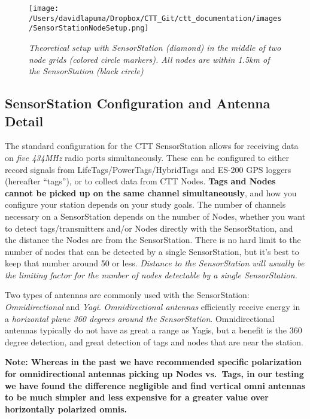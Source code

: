 \documentclass[
]{article}
\begin{document}
\begin{figure}
\hypertarget{id}{%
\centering
\texttt{[image: /Users/davidlapuma/Dropbox/CTT\_Git/ctt\_documentation/images/SensorStationNodeSetup.png]}
\caption{\emph{Theoretical setup with SensorStation (diamond) in the
middle of two node grids (colored circle markers). All nodes are within
1.5km of the SensorStation (black circle)}}\label{id}
}
\end{figure}

\hypertarget{sensorstation-configuration-and-antenna-detail}{%
\subsection{SensorStation Configuration and Antenna
Detail}\label{sensorstation-configuration-and-antenna-detail}}

The standard configuration for the CTT SensorStation allows for
receiving data on \emph{five 434MHz} radio ports simultaneously. These
can be configured to either record signals from
LifeTags/PowerTags/HybridTags and ES-200 GPS loggers (hereafter
``tags''), or to collect data from CTT Nodes. \textbf{Tags and Nodes
cannot be picked up on the same channel simultaneously}, and how you
configure your station depends on your study goals. The number of
channels necessary on a SensorStation depends on the number of Nodes,
whether you want to detect tags/transmitters and/or Nodes directly with
the SensorStation, and the distance the Nodes are from the
SensorStation. There is no hard limit to the number of nodes that can be
detected by a single SensorStation, but it's best to keep that number
around 50 or less. \emph{Distance to the SensorStation will usually be
the limiting factor for the number of nodes detectable by a single
SensorStation.}

Two types of antennas are commonly used with the SensorStation:
\emph{Omnidirectional} and \emph{Yagi}. \emph{Omnidirectional antennas}
efficiently receive energy in a \emph{horizontal plane 360 degrees
around the SensorStation}. Omnidirectional antennas typically do not
have as great a range as Yagis, but a benefit is the 360 degree
detection, and great detection of tags and nodes that are near the
station.

\textbf{Note: Whereas in the past we have recommended specific
polarization for omnidirectional antennas picking up Nodes vs.~Tags, in
our testing we have found the difference negligible and find vertical
omni antennas to be much simpler and less expensive for a greater value
over horizontally polarized omnis.}
\end{document}
